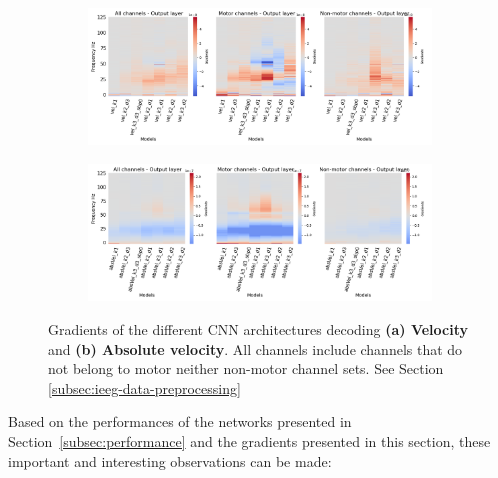 \begin{figure}[!htpb]
\centering
\begin{subfigure}[b]{\textwidth}
   \includegraphics[width=1\linewidth]{img/ch4/vel-last-layer-grads}
   \caption{}
   \label{fig:absVel-last-layer-grads}
\end{subfigure}

\begin{subfigure}[b]{\textwidth}
   \includegraphics[width=1\linewidth]{img/ch4/absVel-last-layer-grads}
   \caption{}
   \label{fig:vel-last-layer-grads}
\end{subfigure}
\caption[Non-shifted causal prediction - gradients]{Gradients of the different CNN architectures decoding \textbf{(a) Velocity} and \textbf{(b) Absolute velocity}. All channels include channels that do not belong to motor neither non-motor channel sets. See Section \ref{subsec:ieeg-data-preprocessing}}
\label{fig:last-layer-grads}
\end{figure}


Based on the performances of the networks presented in Section~\ref{subsec:performance} and the gradients presented in this section, these important and interesting observations can be made:

